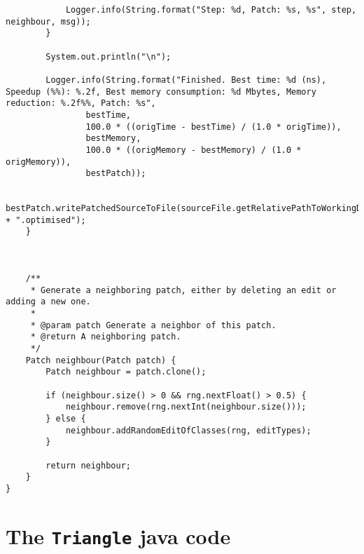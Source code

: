 \begin{lstlisting}
            Logger.info(String.format("Step: %d, Patch: %s, %s", step, neighbour, msg));
        }

        System.out.println("\n");

        Logger.info(String.format("Finished. Best time: %d (ns), Speedup (%%): %.2f, Best memory consumption: %d Mbytes, Memory reduction: %.2f%%, Patch: %s",
                bestTime,
                100.0 * ((origTime - bestTime) / (1.0 * origTime)),
                bestMemory,
                100.0 * ((origMemory - bestMemory) / (1.0 * origMemory)),
                bestPatch));

        bestPatch.writePatchedSourceToFile(sourceFile.getRelativePathToWorkingDir() + ".optimised");
    }



    /**
     * Generate a neighboring patch, either by deleting an edit or adding a new one.
     *
     * @param patch Generate a neighbor of this patch.
     * @return A neighboring patch.
     */
    Patch neighbour(Patch patch) {
        Patch neighbour = patch.clone();

        if (neighbour.size() > 0 && rng.nextFloat() > 0.5) {
            neighbour.remove(rng.nextInt(neighbour.size()));
        } else {
            neighbour.addRandomEditOfClasses(rng, editTypes);
        }

        return neighbour;
    }
}

\end{lstlisting}

\section{The \texttt{Triangle} java code}\label{sec:triangle}

